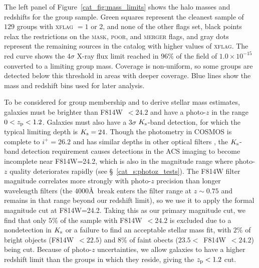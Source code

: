 The left panel of Figure~\ref{cat_fig:mass_limits} shows the halo masses
and redshifts for the group sample. Green squares represent the
cleanest sample of $129$ groups with \textsc{xflag} $=1$ or 2, and
none of the other flags set, black points relax the restrictions on
the \textsc{mask}, \textsc{poor}, and \textsc{merger} flags, and gray
dots represent the remaining sources in the catalog with higher values
of \textsc{xflag}. The red curve shows the $4\sigma$ X-ray flux limit
reached in $96\%$ of the field of $1.0 \times 10^{-15}$ \flux converted to a limiting group
mass. Coverage is non-uniform, so some groups are detected below this
threshold in areas with deeper coverage. Blue lines show the mass and
redshift bins used for later analysis.

To be considered for group membership and to derive stellar mass
estimates, galaxies must be brighter than F814W~$<24.2$ and have a
photo-$z$ in the range $0<\mbox{$z_{\rm p}$}<1.2$. Galaxies must also have a
$3\sigma$ $K_{\rm s}$-band detection, 
for which the typical limiting depth is $K_{\rm s}=24$. Though the
photometry in COSMOS is complete to $i^+=26.2$ and has similar depths
in other optical filters \citep{Capak2007b}, the $K_{\rm s}$-band
detection requirement causes detections in the ACS imaging to
become incomplete near F814W=24.2, which is also in the magnitude
range where photo-$z$ quality deteriorates rapidly (see
\S~\ref{cat_s:photoz_tests}). The F814W filter magnitude correlates more
strongly with photo-$z$ precision than longer wavelength filters (the
$4000$\AA\ break enters the filter range at $z\sim 0.75$ and remains
in that range beyond our redshift limit), so we use it to apply the
formal magnitude cut at F814W=24.2. Taking this as our primary
magnitude cut, we find that only $5\%$ of the sample with F814W~$<24.2$
is excluded due to a nondetection in $K_{\rm s}$ or a failure to find
an acceptable stellar mass fit, with $2\%$ of bright objects
(F814W~$<22.5$) and $8\%$ of faint obects ($23.5<$~F814W~$<24.2$) being cut.
Because of photo-$z$ uncertainties, we allow galaxies to have a
higher redshift limit than the groups in which they reside, giving the
$\mbox{$z_{\rm p}$}<1.2$ cut.

